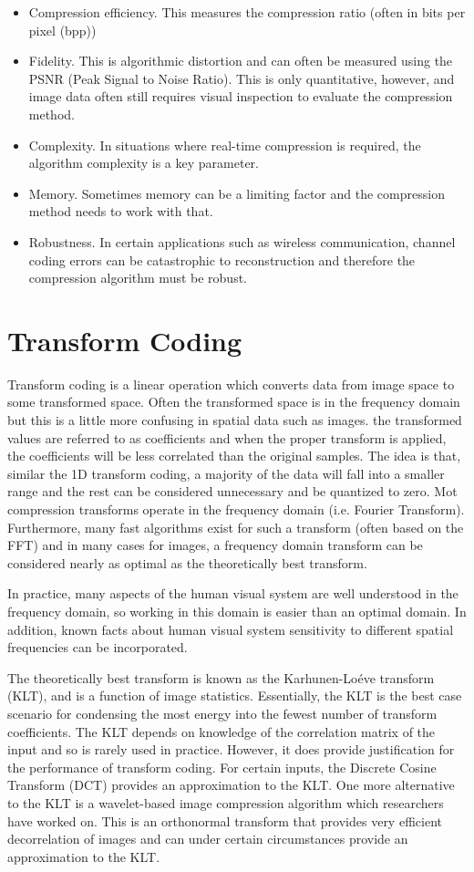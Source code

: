 \documentclass[11pt,a4paper]{article}
\begin{document}
\begin{itemize}
\item Compression efficiency. This measures the compression ratio (often in bits per pixel (bpp))
\item Fidelity. This is algorithmic distortion and can often be measured using the PSNR (Peak Signal to Noise Ratio). This is only quantitative, however, and image data often still requires visual inspection to evaluate the compression method.
\item Complexity. In situations where real-time compression is required, the algorithm complexity is a key parameter.
\item Memory. Sometimes memory can be a limiting factor and the compression method needs to work with that.
\item Robustness. In certain applications such as wireless communication, channel coding errors can be catastrophic to reconstruction and therefore the compression algorithm must be robust.
\end{itemize}

\section{Transform Coding}
Transform coding is a linear operation which converts data from image space to some transformed space. Often the transformed space is in the frequency domain but this is a little more confusing in spatial data such as images. the transformed values are referred to as coefficients and when the proper transform is applied, the coefficients will be less correlated than the original samples. The idea is that, similar the 1D transform coding, a majority of the data will fall into a smaller range and the rest can be considered unnecessary and be quantized to zero. Mot compression transforms operate in the frequency domain (i.e. Fourier Transform). Furthermore, many fast algorithms exist for such a transform (often based on the FFT) and in many cases for images, a frequency domain transform can be considered nearly as optimal as the theoretically best transform.

In practice, many aspects of the human visual system are well understood in the frequency domain, so working in this domain is easier than an optimal domain. In addition, known facts about human visual system sensitivity to different spatial frequencies can be incorporated.

The theoretically best transform is known as the Karhunen-Lo\'eve transform (KLT), and is a function of image statistics. Essentially, the KLT is the best case scenario for condensing the most energy into the fewest number of transform coefficients. The KLT depends on knowledge of the correlation matrix of the input and so is rarely used in practice. However, it does provide justification for the performance of transform coding. For certain inputs, the Discrete Cosine Transform (DCT) provides an approximation to the KLT. One more alternative to the KLT is a wavelet-based image compression algorithm which researchers have worked on. This is an orthonormal transform that provides very efficient decorrelation of images and can under certain circumstances provide an approximation to the KLT.
\end{document}
